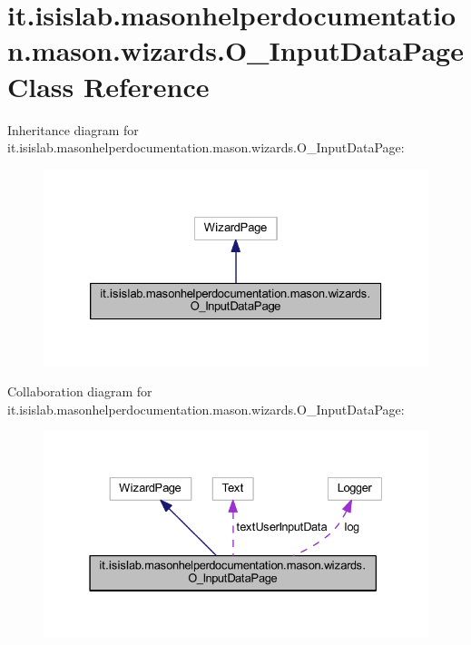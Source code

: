 \hypertarget{classit_1_1isislab_1_1masonhelperdocumentation_1_1mason_1_1wizards_1_1_o___input_data_page}{\section{it.\-isislab.\-masonhelperdocumentation.\-mason.\-wizards.\-O\-\_\-\-Input\-Data\-Page Class Reference}
\label{classit_1_1isislab_1_1masonhelperdocumentation_1_1mason_1_1wizards_1_1_o___input_data_page}
}


Inheritance diagram for it.\-isislab.\-masonhelperdocumentation.\-mason.\-wizards.\-O\-\_\-\-Input\-Data\-Page\-:
\nopagebreak
\begin{figure}[H]
\begin{center}
\leavevmode
\includegraphics[width=326pt]{classit_1_1isislab_1_1masonhelperdocumentation_1_1mason_1_1wizards_1_1_o___input_data_page__inherit__graph}
\end{center}
\end{figure}


Collaboration diagram for it.\-isislab.\-masonhelperdocumentation.\-mason.\-wizards.\-O\-\_\-\-Input\-Data\-Page\-:
\nopagebreak
\begin{figure}[H]
\begin{center}
\leavevmode
\includegraphics[width=331pt]{classit_1_1isislab_1_1masonhelperdocumentation_1_1mason_1_1wizards_1_1_o___input_data_page__coll__graph}
\end{center}
\end{figure}
